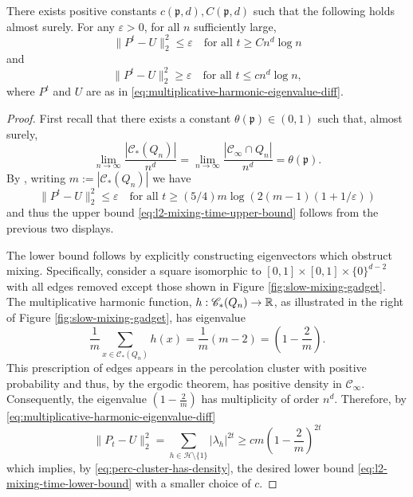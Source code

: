 \documentclass[12pt]{amsart}
\numberwithin{equation}{section}
\begin{document}
	\begin{theorem} \label{theorem:slow-mixing-percolation}
		There exists positive constants $c(\mathfrak{p}, d), C(\mathfrak{p},d)$ such that the following holds almost surely.
		For any $\varepsilon > 0$, for all $n$ sufficiently large, 
		\begin{equation} \label{eq:l2-mixing-time-upper-bound}
			\| P^t - U\|_2^2 \leq \varepsilon \quad \mbox{for all $t \geq C n^d \log n$}
		\end{equation}
		and
		\begin{equation} \label{eq:l2-mixing-time-lower-bound}
			\| P^t - U\|_2^2 \geq \varepsilon \quad \mbox{for all $t \leq c n^d \log n$},
		\end{equation}
		where $P^t$ and $U$ are as in \eqref{eq:multiplicative-harmonic-eigenvalue-diff}. 
	\end{theorem}
	\begin{proof}
		First recall that there exists a constant $\theta(\mathfrak{p}) \in (0,1)$ such that, almost surely, 
		\begin{equation} \label{eq:perc-cluster-has-density}
			\lim_{n \to \infty} \frac{|\mathscr{C}_{*}(Q_n)| }{n^d} = 	\lim_{n \to \infty} \frac{|\mathscr{C}_{\infty} \cap Q_n|}{n^d} = \theta(\mathfrak{p}).
		\end{equation}
		By \cite[Theorem 4.3]{jerison-levine-pike-2019}, writing $m := |\mathscr{C}_{*}(Q_n)|$ we have 
		\[
		\| P^t - U\|_2^2 \leq \varepsilon \quad \mbox{for all $t \geq  (5/4) m \log \left( 2 (m-1)(1 + 1/\varepsilon) \right)$}
		\]
		and thus the upper bound \eqref{eq:l2-mixing-time-upper-bound} follows from the previous two displays. 
		
		The lower bound follows by explicitly constructing eigenvectors which obstruct mixing. Specifically, 
		consider a square isomorphic to $[0, 1] \times [0,1] \times \{0\}^{d-2}$ with all edges removed
		except those shown in Figure \ref{fig:slow-mixing-gadget}.  The multiplicative harmonic function, $h: \mathscr{C}_*(Q_n) \to \operatorname{\mathbb{R}}$, as illustrated in the right of Figure \ref{fig:slow-mixing-gadget}, has eigenvalue 
		\[
		\frac{1}{m} \sum_{x \in \mathscr{C}_{*}(Q_n)} h(x) =  \frac{1}{m} \left( m - 2 \right) = (1 - \frac{2}{m}). 
		\]
		This prescription of edges appears in the percolation cluster with positive probability 
		and thus, by the ergodic theorem, has positive density in  $\mathscr{C}_{\infty}$. Consequently, the eigenvalue $(1 - \frac{2}{m})$ has multiplicity of order $n^d$. Therefore, by \eqref{eq:multiplicative-harmonic-eigenvalue-diff}
		\[
		\| P_t - U\|^2_2 = \sum_{h \in \mathcal{H} \setminus \{1\}} | \lambda_h|^{2 t}
		\geq c m (1- \frac{2}{m})^{2 t}
		\]
		which implies, by 	\eqref{eq:perc-cluster-has-density}, the desired lower bound \eqref{eq:l2-mixing-time-lower-bound} with a smaller choice of $c$. 
	\end{proof}
\end{document}
